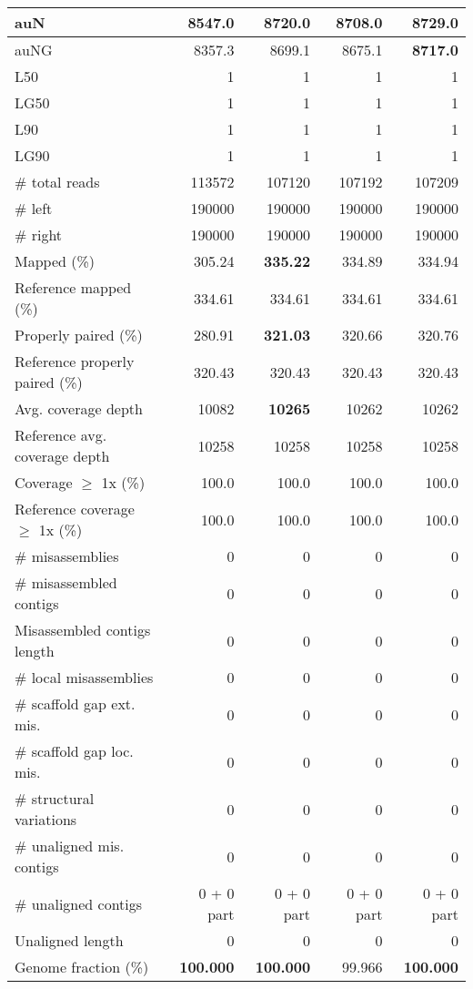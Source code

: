 \documentclass[12pt,a4paper]{article}
\begin{document}
\begin{table}[ht]
\begin{center}
\begin{tabular}{|l*{4}{|r}|}
auN & 8547.0 & 8720.0 & 8708.0 & {\bf 8729.0} \\ \hline
auNG & 8357.3 & 8699.1 & 8675.1 & {\bf 8717.0} \\ \hline
L50 & 1 & 1 & 1 & 1 \\ \hline
LG50 & 1 & 1 & 1 & 1 \\ \hline
L90 & 1 & 1 & 1 & 1 \\ \hline
LG90 & 1 & 1 & 1 & 1 \\ \hline
\# total reads & 113572 & 107120 & 107192 & 107209 \\ \hline
\# left & 190000 & 190000 & 190000 & 190000 \\ \hline
\# right & 190000 & 190000 & 190000 & 190000 \\ \hline
Mapped (\%) & 305.24 & {\bf 335.22} & 334.89 & 334.94 \\ \hline
Reference mapped (\%) & 334.61 & 334.61 & 334.61 & 334.61 \\ \hline
Properly paired (\%) & 280.91 & {\bf 321.03} & 320.66 & 320.76 \\ \hline
Reference properly paired (\%) & 320.43 & 320.43 & 320.43 & 320.43 \\ \hline
Avg. coverage depth & 10082 & {\bf 10265} & 10262 & 10262 \\ \hline
Reference avg. coverage depth & 10258 & 10258 & 10258 & 10258 \\ \hline
Coverage $\geq$ 1x (\%) & 100.0 & 100.0 & 100.0 & 100.0 \\ \hline
Reference coverage $\geq$ 1x (\%) & 100.0 & 100.0 & 100.0 & 100.0 \\ \hline
\# misassemblies & 0 & 0 & 0 & 0 \\ \hline
\# misassembled contigs & 0 & 0 & 0 & 0 \\ \hline
Misassembled contigs length & 0 & 0 & 0 & 0 \\ \hline
\# local misassemblies & 0 & 0 & 0 & 0 \\ \hline
\# scaffold gap ext. mis. & 0 & 0 & 0 & 0 \\ \hline
\# scaffold gap loc. mis. & 0 & 0 & 0 & 0 \\ \hline
\# structural variations & 0 & 0 & 0 & 0 \\ \hline
\# unaligned mis. contigs & 0 & 0 & 0 & 0 \\ \hline
\# unaligned contigs & 0 + 0 part & 0 + 0 part & 0 + 0 part & 0 + 0 part \\ \hline
Unaligned length & 0 & 0 & 0 & 0 \\ \hline
Genome fraction (\%) & {\bf 100.000} & {\bf 100.000} & 99.966 & {\bf 100.000} \\ \hline

\end{tabular}
\end{center}
\end{table}
\end{document}
